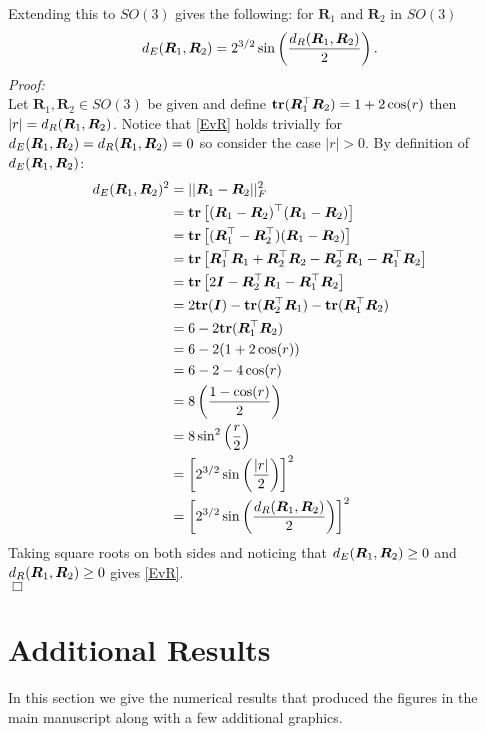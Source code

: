 Extending this to $SO(3)$ gives the following: for $\bm{R}_1$ and $\bm{R}_2$ in $SO(3)$
\begin{equation}\label{EvR}
{d_E} (\bm{R}_1,\bm{R}_2)=2^{3/2}\sin\left(\frac{{d_R}(\bm{R}_1,\bm{R}_2)}{2}\right).
\end{equation}
\emph{Proof:}\\
Let $\bm{R}_1,\bm{R}_2\in SO(3)$ be given and define ${\mathbf{tr}}(\bm R_1^\top\bm R_2)=1+2\cos(r)$ then $|r|={d_R}(\bm R_1,\bm R_2)$.  Notice that \eqref{EvR} holds trivially for ${d_E} (\bm R_1,\bm R_2)={d_R}(\bm R_1,\bm R_2)=0$ so consider the case $|r|>0$.  By definition of ${d_E} (\bm R_1,\bm R_2)$:
\begin{align*}
{d_E} (\bm R_1,\bm R_2)^2
&=||\bm R_1-\bm R_2||_F^2\\
&={\mathbf{tr}}\left[(\bm R_1-\bm R_2)^\top(\bm R_1-\bm R_2)\right]\\
&={\mathbf{tr}}\left[(\bm R_1^\top-\bm R_2^\top)(\bm R_1-\bm R_2)\right]\\
&={\mathbf{tr}}\left[\bm R_1^\top\bm R_1+\bm R_2^\top\bm R_2-\bm R_2^\top\bm R_1-\bm R_1^\top\bm R_2\right]\\
&={\mathbf{tr}}\left[2\bm{I}-\bm R_2^\top\bm R_1-\bm R_1^\top\bm R_2\right]\\
&=2{\mathbf{tr}}(\bm{I})-{\mathbf{tr}}(\bm R_2^\top\bm R_1)-{\mathbf{tr}}(\bm R_1^\top\bm R_2)\\
&=6-2{\mathbf{tr}}(\bm R_1^\top\bm R_2)\\
&=6-2(1+2\cos(r))\\
&=6-2-4\cos(r)\\
&=8\left(\frac{1-\cos(r)}{2}\right)\\
&=8\sin^2\left(\frac{r}{2}\right)\\
&=\left[2^{3/2}\sin\left(\frac{|r|}{2}\right)\right]^2\\
&=\left[2^{3/2}\sin\left(\frac{{d_R}(\bm R_1,\bm R_2)}{2}\right)\right]^2
\end{align*}
Taking square roots on both sides and noticing that ${d_E} (\bm R_1,\bm R_2)\geq0$ and ${d_R} (\bm R_1,\bm R_2)\geq0$ gives \eqref{EvR}.\\
$\Box$

\section{Additional Results}
\label{sec:appendix3}
In this section we give the numerical results that produced the figures in the main manuscript along with a few additional graphics.

